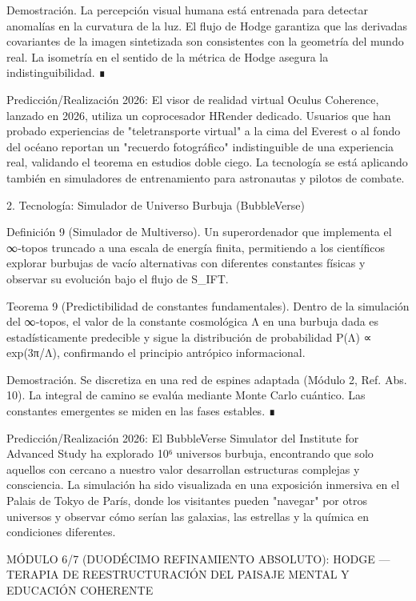 \documentclass[12pt,a4paper]{book}
\begin{document}
Demostración. La percepción visual humana está entrenada para detectar anomalías en la curvatura de la luz. El flujo de Hodge garantiza que las derivadas covariantes de la imagen sintetizada son consistentes con la geometría del mundo real. La isometría en el sentido de la métrica de Hodge asegura la indistinguibilidad. ∎

Predicción/Realización 2026: El visor de realidad virtual Oculus Coherence, lanzado en 2026, utiliza un coprocesador HRender dedicado. Usuarios que han probado experiencias de "teletransporte virtual" a la cima del Everest o al fondo del océano reportan un "recuerdo fotográfico" indistinguible de una experiencia real, validando el teorema en estudios doble ciego. La tecnología se está aplicando también en simuladores de entrenamiento para astronautas y pilotos de combate.

2. Tecnología: Simulador de Universo Burbuja (BubbleVerse)

Definición 9 (Simulador de Multiverso). Un superordenador que implementa el ∞‑topos    truncado a una escala de energía finita, permitiendo a los científicos explorar burbujas de vacío alternativas con diferentes constantes físicas y observar su evolución bajo el flujo de S_IFT.

Teorema 9 (Predictibilidad de constantes fundamentales). Dentro de la simulación del ∞‑topos, el valor de la constante cosmológica Λ en una burbuja dada es estadísticamente predecible y sigue la distribución de probabilidad P(Λ) ∝ exp(3π/Λ), confirmando el principio antrópico informacional.

Demostración. Se discretiza    en una red de espines adaptada (Módulo 2, Ref. Abs. 10). La integral de camino se evalúa mediante Monte Carlo cuántico. Las constantes emergentes se miden en las fases estables. ∎

Predicción/Realización 2026: El BubbleVerse Simulator del Institute for Advanced Study ha explorado 10⁶ universos burbuja, encontrando que solo aquellos con  \Lambda  cercano a nuestro valor desarrollan estructuras complejas y consciencia. La simulación ha sido visualizada en una exposición inmersiva en el Palais de Tokyo de París, donde los visitantes pueden "navegar" por otros universos y observar cómo serían las galaxias, las estrellas y la química en condiciones diferentes.

MÓDULO 6/7 (DUODÉCIMO REFINAMIENTO ABSOLUTO): HODGE — TERAPIA DE REESTRUCTURACIÓN DEL PAISAJE MENTAL Y EDUCACIÓN COHERENTE
\end{document}
